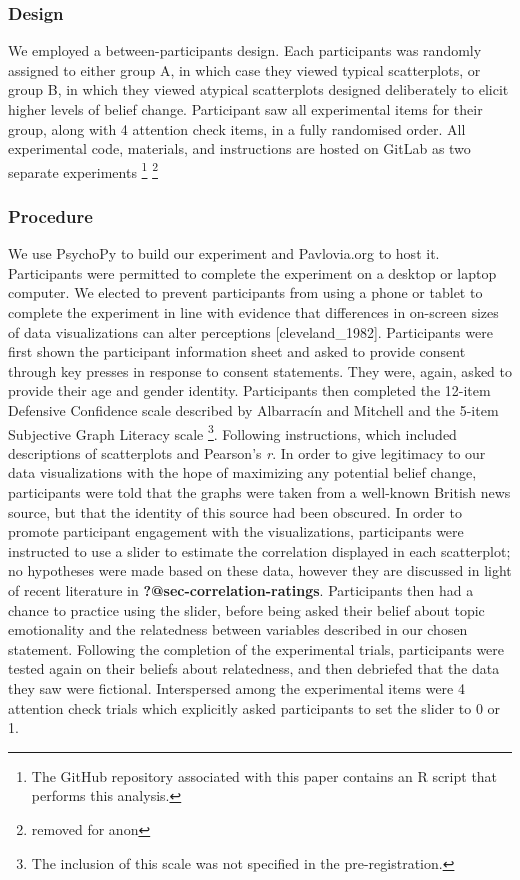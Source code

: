 \documentclass[manuscript,screen,review]{acmart}
\begin{document}
\subsubsection{Design}\label{design}

We employed a between-participants design. Each participants was
randomly assigned to either group A, in which case they viewed typical
scatterplots, or group B, in which they viewed atypical scatterplots
designed deliberately to elicit higher levels of belief change.
Participant saw all experimental items for their group, along with 4
attention check items, in a fully randomised order. All experimental
code, materials, and instructions are hosted on GitLab as two separate
experiments \footnote{The GitHub repository associated with this paper
  contains an R script that performs this analysis.} \footnote{removed
  for anon}

\subsubsection{Procedure}\label{procedure}

We use PsychoPy \citep{pierce_2019} to build our experiment and
Pavlovia.org to host it. Participants were permitted to complete the
experiment on a desktop or laptop computer. We elected to prevent
participants from using a phone or tablet to complete the experiment in
line with evidence that differences in on-screen sizes of data
visualizations can alter perceptions {[}cleveland\_1982{]}. Participants
were first shown the participant information sheet and asked to provide
consent through key presses in response to consent statements. They
were, again, asked to provide their age and gender identity.
Participants then completed the 12-item Defensive Confidence scale
described by Albarracín and Mitchell \citep{albarracin_2004} and the
5-item Subjective Graph Literacy scale \citep{garcia_2016}\footnote{The
  inclusion of this scale was not specified in the pre-registration.}.
Following instructions, which included descriptions of scatterplots and
Pearson's \emph{r}. In order to give legitimacy to our data
visualizations with the hope of maximizing any potential belief change,
participants were told that the graphs were taken from a well-known
British news source, but that the identity of this source had been
obscured. In order to promote participant engagement with the
visualizations, participants were instructed to use a slider to estimate
the correlation displayed in each scatterplot; no hypotheses were made
based on these data, however they are discussed in light of recent
literature in \textbf{?@sec-correlation-ratings}. Participants then had
a chance to practice using the slider, before being asked their belief
about topic emotionality and the relatedness between variables described
in our chosen statement. Following the completion of the experimental
trials, participants were tested again on their beliefs about
relatedness, and then debriefed that the data they saw were fictional.
Interspersed among the experimental items were 4 attention check trials
which explicitly asked participants to set the slider to 0 or 1.
\end{document}
